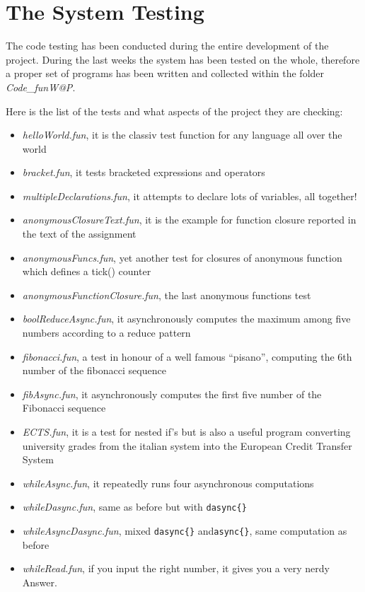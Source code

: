 \chapter{\label{chapter6} The System Testing}

The code testing has been conducted during the entire development of the project. During the last weeks the system has been tested on the whole, therefore a proper set of \fwap programs has been written and collected within the folder \textsl{Code_funW@P}. 

Here is the list of the tests and what aspects of the project they are checking:
\begin{itemize}
	\item \textit{helloWorld.fun}, it is the classiv test function for any language all over the world
	\item \textit{bracket.fun}, it tests bracketed expressions and operators
\item \textit{multipleDeclarations.fun}, it attempts to declare lots of variables, all together!
	\item \textit{anonymousClosureText.fun}, it is the example for function closure reported in the text of the assignment \cite{exercise}
	\item \textit{anonymousFuncs.fun}, yet another test for closures of anonymous function which defines a tick() counter
	\item \textit{anonymousFunctionClosure.fun}, the last anonymous functions test
	\item \textit{boolReduceAsync.fun}, it asynchronously computes the maximum among five numbers according to a reduce pattern
	\item \textit{fibonacci.fun}, a test in honour of a well famous "`pisano"', computing the 6th number of the fibonacci sequence
	\item \textit{fibAsync.fun}, it asynchronously computes the first five number of the Fibonacci sequence
	\item \textit{ECTS.fun}, it is a test for nested if's but is also a useful program converting university grades from the italian system into the European Credit Transfer System \cite{ects}
\item \textit{whileAsync.fun}, it repeatedly runs four asynchronous computations
\item \textit{whileDasync.fun}, same as before but with \texttt{dasync\{\}}
\item \textit{whileAsyncDasync.fun}, mixed \texttt{dasync\{\}} and\texttt{async\{\}}, same computation as before
\item \textit{whileRead.fun}, if you input the right number, it gives you a very nerdy Answer.
\end{itemize}
